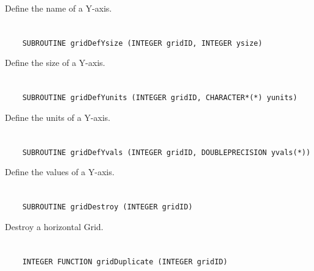 Define the name of a Y-axis.


\section*{\tt {}}

\begin{verbatim}
    SUBROUTINE gridDefYsize (INTEGER gridID, INTEGER ysize)
\end{verbatim}

Define the size of a Y-axis.


\section*{\tt {}}

\begin{verbatim}
    SUBROUTINE gridDefYunits (INTEGER gridID, CHARACTER*(*) yunits)
\end{verbatim}

Define the units of a Y-axis.


\section*{\tt {}}

\begin{verbatim}
    SUBROUTINE gridDefYvals (INTEGER gridID, DOUBLEPRECISION yvals(*))
\end{verbatim}

Define the values of a Y-axis.


\section*{\tt {}}

\begin{verbatim}
    SUBROUTINE gridDestroy (INTEGER gridID)
\end{verbatim}

Destroy a horizontal Grid.


\section*{\tt {}}

\begin{verbatim}
    INTEGER FUNCTION gridDuplicate (INTEGER gridID)
\end{verbatim}

